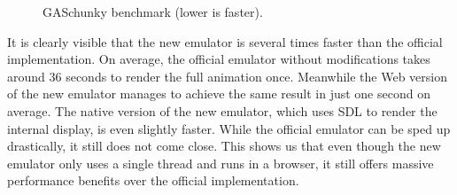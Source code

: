 \begin{figure}[ht]
  \centering
  \caption{GASchunky benchmark (lower is faster).}%
  \label{fig:gachunky-plot}
\end{figure}

It is clearly visible that the new emulator is several times faster than the official implementation.
On average, the official emulator without modifications takes around 36 seconds to render the full animation once.
Meanwhile the Web version of the new emulator manages to achieve the same result in just one second on average.
The native version of the new emulator, which uses SDL to render the internal display, is even slightly faster.
While the official emulator can be sped up drastically, it still does not come close.
This shows us that even though the new emulator only uses a single thread and runs in a browser, it still offers massive performance benefits over the official implementation.
